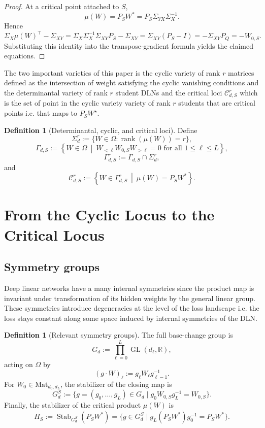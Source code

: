 \documentclass[11pt]{article}
\newcommand{\rk}{\operatorname{rank}}
\newcommand{\GL}{\operatorname{GL}}
\newcommand{\Stab}{\operatorname{Stab}}
\newcommand{\R}{\mathbb{R}}
\theoremstyle{definition}
\newtheorem{definition}[theorem]{Definition}
\begin{document}
\begin{proof}
At a critical point attached to \(S\),
\[
\mu(W)=P_SW^\ast=P_S\Sigma_{YX}\Sigma_X^{-1}.
\]
Hence
\[
\Sigma_X\mu(W)^\top-\Sigma_{XY}
=
\Sigma_X\Sigma_X^{-1}\Sigma_{XY}P_S-\Sigma_{XY}
=
\Sigma_{XY}(P_S-I)
=
-\Sigma_{XY}P_Q
=
-W_{0,S}.
\]
Substituting this identity into the transpose-gradient formula yields the
claimed equations.
\end{proof}
The two important varieties of this paper is the cyclic variety of rank $r$ matrices defined as the intersection of weight satisfying the cyclic vanishing conditions and the determinantal variety of rank $r$ student DLNs and the critical loci $\mathcal{C}^r_{d,S}$ which is the set of point in the cyclic variety variety of rank $r$ students that are critical points i.e. that maps to $P_SW^{\star}$. 
\begin{definition}[Determinantal, cyclic, and critical loci]
Define
\[
\Sigma_d^r:=\{W\in \Omega:\rk(\mu(W))=r\},
\]
\[
\Gamma_{d,S}
:=
\left\{
W\in \Omega
\ \middle|\
W_{<\ell}W_{0,S}W_{>\ell}=0
\text{ for all }1\leq \ell\leq L
\right\},
\]
\[
\Gamma_{d,S}^r:=\Gamma_{d,S}\cap \Sigma_d^r,
\]
and
\[
\mathcal C_{d,S}^r
:=
\left\{
W\in \Gamma_{d,S}^r
\ \middle|\
\mu(W)=P_SW^\ast
\right\}.
\]
\end{definition}

\section{From the Cyclic Locus to the Critical Locus}

\subsection{Symmetry groups}
Deep linear networks have a many internal symmetries since the product map is invariant under transformation of its hidden weights by the general linear group. These symmetries introduce degeneracies at the level of the loss landscape i.e. the loss stays constant along some space induced by internal symmetries of the DLN. 
\begin{definition}[Relevant symmetry groups]
The full base-change group is
\[
G_d:=\prod_{\ell=0}^L \GL(d_\ell,\R),
\]
acting on \(\Omega\) by
\[
(g\cdot W)_\ell:=g_\ell W_\ell g_{\ell-1}^{-1}.
\]
For $W_0\in \text{Mat}_{d_0,d_L}$, the stabilizer of the closing map is
\[
G_d^{S}
:=
\{g=(g_0,\dots,g_L)\in G_d\mid g_0W_{0,S}g_L^{-1}=W_{0,S}\}.
\]
Finally, the stabilizer of the critical product $\mu(W)$ is
\[
H_S
:=
\Stab_{G_d^{S}}(P_SW^\ast)
=
\{g\in G_d^{S}\mid g_L(P_SW^\ast)g_0^{-1}=P_SW^\ast\}.
\]
\end{definition}
\end{document}
